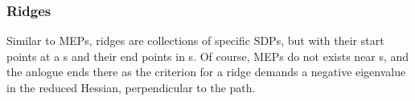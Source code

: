 
\subsubsection{Ridges}

Similar to MEPs, ridges are collections of specific SDPs, but with their start points at a s and their end points in s.
Of course, MEPs do not exists near s, and the anlogue ends there as the criterion for a ridge demands a negative eigenvalue in the reduced Hessian, perpendicular to the path.

